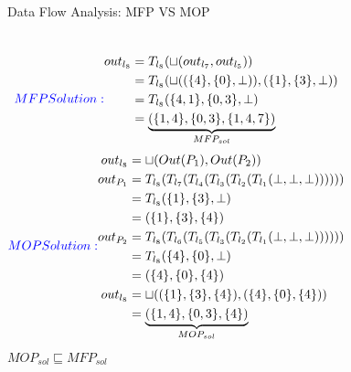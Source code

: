 \begin{frame}{Data Flow Analysis: MFP VS MOP}
\begin{columns}
	
	
	\tiny
	
	
	\begin{subequations}
		\textcolor{blue}{MFP Solution:}
		\begin{align}
		out_{l_8} &= T_{l_8}(\sqcup(out_{l_7}, out_{l_5}))\\
		&= T_{l_8}(\sqcup((\{4\},\{0\},\perp)),(\{1\},\{3\},\perp))\\
		&= T_{l_8}(\{4,1\},\{0,3\},\perp)\\
		&= \underbrace{(\{1,4\},\{0,3\},\{1,4,7\})}_{MFP_{sol}}
		\end{align}
	\end{subequations}
	\begin{subequations}
			\textcolor{blue}{MOP Solution:}
		\begin{align}
		out_{l_8} &=\sqcup( Out(P_1), Out(P_2))\\	
		out_{P_1}  &= T_{l_8}(T_{l_7}(T_{l_4}(T_{l_3}(T_{l_2}(T_{l_1}(\perp,\perp,\perp))))))\\
		&=T_{l_8}(\{1\},\{3\},\perp)\\
		&= (\{1\},\{3\},\{4\})\\
		out_{P_2}  &= T_{l_8}(T_{l_6}(T_{l_5}(T_{l_3}(T_{l_2}(T_{l_1}(\perp,\perp,\perp))))))\\
		&=T_{l_8}(\{4\},\{0\},\perp)\\
		&=(\{4\},\{0\},\{4\})\\
		out_{l_8} &=\sqcup( (\{1\},\{3\},\{4\}),(\{4\},\{0\},\{4\}))\\
		&= \underbrace{(\{1,4\},\{0,3\},\{4\})}_{MOP_{sol}}
		\end{align}
	\end{subequations}
	\normalsize $MOP_{sol} \sqsubseteq MFP_{sol}$
\end{columns}
\end{frame}


